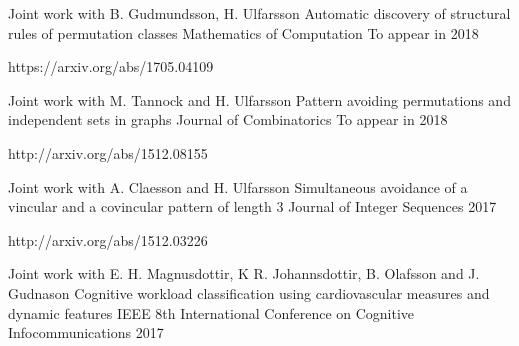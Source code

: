 


\begin{cventries}
  \cventry
    {Joint work with B. Gudmundsson, H. Ulfarsson} %
    {Automatic discovery of structural rules of permutation classes} %
    {Mathematics of Computation} %
    {To appear in 2018} %
    {
      \begin{cvitems} %
        \item {https://arxiv.org/abs/1705.04109}
      \end{cvitems}
    }
  \cventry
    {Joint work with M. Tannock and H. Ulfarsson} %
    {Pattern avoiding permutations and independent sets in graphs} %
    {Journal of Combinatorics} %
    {To appear in 2018} %
    {
      \begin{cvitems} %
        \item {http://arxiv.org/abs/1512.08155}
      \end{cvitems}
    }
  \cventry
    {Joint work with A. Claesson and H. Ulfarsson} %
    {Simultaneous avoidance of a vincular and a covincular pattern of length 3} %
    {Journal of Integer Sequences} %
    {2017} %
    {
      \begin{cvitems} %
        \item {http://arxiv.org/abs/1512.03226}
      \end{cvitems}
    }
  \cventry
    {Joint work with E. H. Magnusdottir, K R. Johannsdottir, B. Olafsson and J. Gudnason} %
    {Cognitive workload classification using cardiovascular measures and dynamic features} %
    {IEEE 8th International Conference on Cognitive Infocommunications} %
    {2017} %
    {
    }
\end{cventries}
